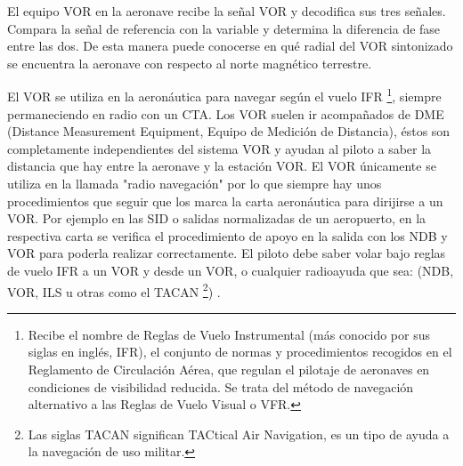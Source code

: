 El equipo VOR en la aeronave recibe la se\~nal VOR y decodifica sus tres se\~nales. Compara la se\~nal de referencia con la variable y determina la diferencia de fase entre las dos. De esta manera puede conocerse en qu\'e radial del VOR sintonizado se encuentra la aeronave con respecto al norte magn\'etico terrestre.

El VOR se utiliza en la aeron\'autica para navegar seg\'un el vuelo IFR \footnote{Recibe el nombre de Reglas de Vuelo Instrumental (m\'as conocido por sus siglas en ingl\'es, IFR), el conjunto de normas y procedimientos recogidos en el Reglamento de Circulaci\'on A\'erea, que regulan el pilotaje de aeronaves en condiciones de visibilidad reducida. Se trata del m\'etodo de navegaci\'on alternativo a las Reglas de Vuelo Visual o VFR.}, siempre permaneciendo en radio con un CTA. Los VOR suelen ir acompa\~nados de DME (Distance Measurement Equipment, Equipo de Medici\'on de Distancia), \'estos son completamente independientes del sistema VOR y ayudan al piloto a saber la distancia que hay entre la aeronave y la estaci\'on VOR. El VOR \'unicamente se utiliza en la llamada "radio navegaci\'on" por lo que siempre hay unos procedimientos que seguir que los marca la carta aeron\'autica para dirijirse a un VOR. Por ejemplo en las SID o salidas normalizadas de un aeropuerto, en la respectiva carta se verifica el procedimiento de apoyo en la salida con los NDB y VOR para poderla realizar correctamente. El piloto debe saber volar bajo reglas de vuelo IFR a un VOR y desde un VOR, o cualquier radioayuda que sea: (NDB, VOR, ILS u otras como el TACAN \footnote{Las siglas TACAN significan  TACtical Air Navigation,  es un tipo de ayuda a la navegaci\'on de uso militar.}) \cite{VOR-Wikipedia}.

